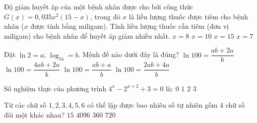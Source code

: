 \begin{ex}
{	}
\end{ex}
\begin{ex}%
	Độ giảm huyết áp của một bệnh nhân được cho bởi công thức $G (x)=0, 035x^2\left (15-x\right)$, trong đó $x$ là liều lượng thuốc được tiêm cho bệnh nhân ($x$ được tính bằng miligam). Tính liều lượng thuốc cần tiêm (đơn vị miligam) cho bệnh nhân để huyết áp giảm nhiều nhất. 
	\choice
	{$x=8$}
	{\True $x=10$}
	{$x=15$}
	{$x=7$}
\end{ex}
\begin{ex}%
	Đặt $\ln 2=a$; $\log_54=b$. Mệnh đề nào dưới đây là đúng?
	\choice
	{$\ln 100=\dfrac{ab+2a}{b}$}
	{$\ln 100=\dfrac{4ab+2a}{b}$}
	{$\ln 100=\dfrac{ab+a}{b}$}
	{\True $\ln 100=\dfrac{2ab+4a}{b}$}
\end{ex}
\begin{ex}%
	Số nghiệm thực của phương trình $4^x-2^{x+2}+3=0$ là:
	\choice
	{$0$}
	{$1$}
	{\True $2$}
	{$3$}
\end{ex}
\begin{ex}%
	Từ các chữ số $1, 2, 3, 4, 5, 6$ có thể lập được bao nhiêu số tự nhiên gồm $4$ chữ số đôi một khác nhau?
	\choice
	{$15$}
	{$4096$}
	{\True $360$}
	{$720$}
\end{ex}
